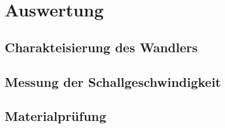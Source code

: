 \chapter{Auswertung} \label{Auswertung}

\section{Charakteisierung des Wandlers}




\section{Messung der Schallgeschwindigkeit} 





\section{Materialprüfung}
